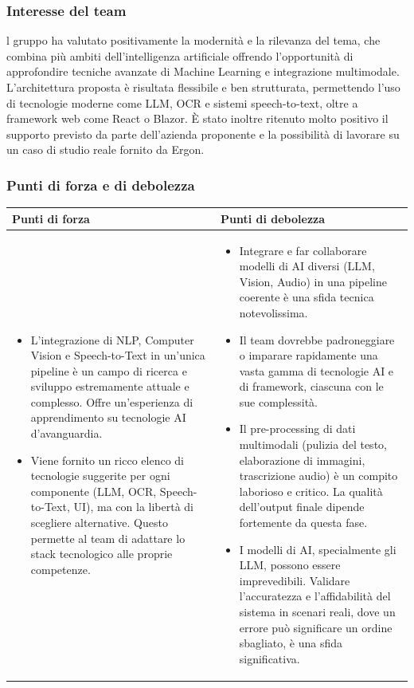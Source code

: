 \documentclass[a4paper,11pt]{article}
\begin{document}
\subsubsection{Interesse del team}
\parbox[t]{\linewidth}{%
l gruppo ha valutato positivamente la modernità e la rilevanza del tema, che
combina più ambiti dell'intelligenza artificiale offrendo l'opportunità di
approfondire tecniche avanzate di Machine Learning e integrazione multimodale.
L'architettura proposta è risultata flessibile e ben strutturata, permettendo l'uso di
tecnologie moderne come LLM, OCR e sistemi speech-to-text, oltre a framework
web come React o Blazor. È stato inoltre ritenuto molto positivo il supporto
previsto da parte dell'azienda proponente e la possibilità di lavorare su un caso di
studio reale fornito da Ergon.
}
\subsubsection{Punti di forza e di debolezza}

{\footnotesize
\begin{tabularx}{\textwidth}{|X|X|}
\hline
\rowcolor{lightgray!40} %
\textbf{Punti di forza} & \textbf{Punti di debolezza} \\
\hline
\begin{itemize}
\item L'integrazione di NLP, Computer Vision e Speech-to-Text in un'unica pipeline è un campo di ricerca e sviluppo estremamente attuale e complesso. Offre un'esperienza di apprendimento su tecnologie AI d'avanguardia.
\item Viene fornito un ricco elenco di tecnologie suggerite per ogni componente (LLM, OCR, Speech-to-Text, UI), ma con la libertà di scegliere alternative. Questo permette al team di adattare lo stack tecnologico alle proprie competenze.
\end{itemize}
 & \begin{itemize}
\item Integrare e far collaborare modelli di AI diversi (LLM, Vision, Audio) in una pipeline coerente è una sfida tecnica notevolissima.
\item Il team dovrebbe padroneggiare o imparare rapidamente una vasta gamma di tecnologie AI e di framework, ciascuna con le sue complessità.
\item Il pre-processing di dati multimodali (pulizia del testo, elaborazione di immagini, trascrizione audio) è un compito laborioso e critico. La qualità dell'output finale dipende fortemente da questa fase.
\item I modelli di AI, specialmente gli LLM, possono essere imprevedibili. Validare l'accuratezza e l'affidabilità del sistema in scenari reali, dove un errore può significare un ordine sbagliato, è una sfida significativa.
\end{itemize} \\
\hline
\end{tabularx}
}
\end{document}
